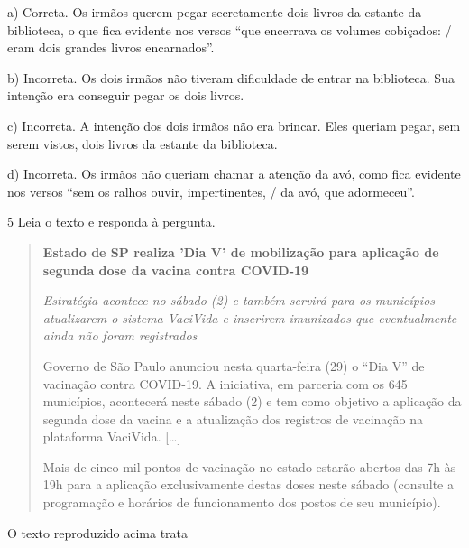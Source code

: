 
a) Correta. Os irmãos querem pegar secretamente dois livros da estante da
biblioteca, o que fica evidente nos versos ``que encerrava os volumes
cobiçados: / eram dois grandes livros encarnados''. 

b) Incorreta. Os dois irmãos não tiveram dificuldade de entrar na 
biblioteca. Sua intenção era conseguir pegar os dois livros.

c) Incorreta. A intenção dos dois irmãos não era brincar. Eles queriam
pegar, sem serem vistos, dois livros da estante da biblioteca. 

d)  Incorreta. Os irmãos não queriam chamar a atenção da avó, como fica 
evidente nos versos ``sem os ralhos ouvir, impertinentes, / da avó, que
adormeceu''.

\num{5} Leia o texto e responda à pergunta.

\begin{quote}
\textbf{Estado de SP realiza 'Dia V' de mobilização para aplicação de
segunda dose da vacina contra COVID-19}

\textit{Estratégia acontece no sábado (2) e também servirá para os
municípios atualizarem o sistema VaciVida e inserirem imunizados que
eventualmente ainda não foram registrados}

Governo de São Paulo anunciou nesta quarta-feira (29) o ``Dia V'' de
vacinação contra COVID-19. A iniciativa, em parceria com os 645
municípios, acontecerá neste sábado (2) e tem como objetivo a aplicação
da segunda dose da vacina e a atualização dos registros de vacinação na
plataforma VaciVida. {[}\ldots{}{]}

Mais de cinco mil pontos de vacinação no estado estarão abertos das 7h
às 19h para a aplicação exclusivamente destas doses neste sábado
(consulte a programação e horários de funcionamento dos postos de seu
município).
\end{quote}


O texto reproduzido acima trata

